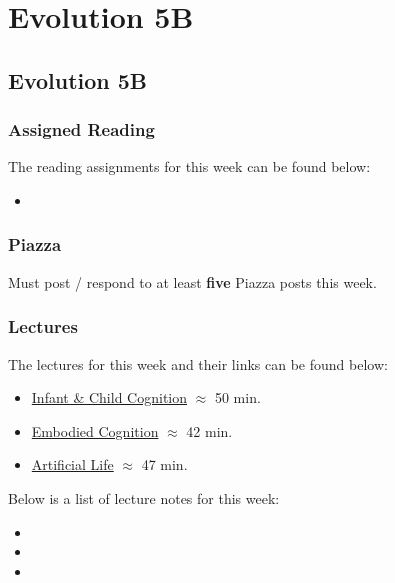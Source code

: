 \clearpage

\renewcommand{\ChapTitle}{Evolution 5B}
\renewcommand{\SectionTitle}{Evolution 5B}

\chapter{\ChapTitle}
\section{\SectionTitle}

\subsection{Assigned Reading}

The reading assignments for this week can be found below:

\begin{itemize}
    \item {}
\end{itemize}

\subsection{Piazza}

Must post / respond to at least \textbf{five} Piazza posts this week.

\subsection{Lectures}

The lectures for this week and their links can be found below:

\begin{itemize}
    \item \href{https://www.youtube.com/watch?v=Xiokcbvthu0}{Infant \& Child Cognition} $\approx$ 50 min.
    \item \href{https://www.youtube.com/watch?v=giCTdefUQUQ}{Embodied Cognition} $\approx$ 42 min.
    \item \href{https://www.youtube.com/watch?v=TTR4FLJGOY8}{Artificial Life} $\approx$ 47 min.
\end{itemize}

\noindent Below is a list of lecture notes for this week:

\begin{itemize}
    \item {}
    \item {}
    \item {}
\end{itemize}

